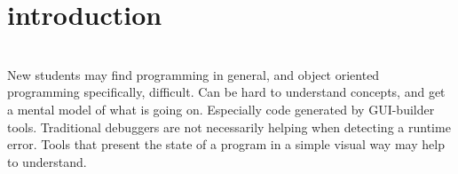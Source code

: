 \section{introduction}\label{introduction}
~\\
New students may find programming in general, and object oriented programming specifically, difficult.
Can be hard to understand concepts, and get a mental model of what is going on.
Especially code generated by GUI-builder tools.
Traditional debuggers are not necessarily helping when detecting a runtime error.
Tools that present the state of a program in a simple visual way may help to understand.
